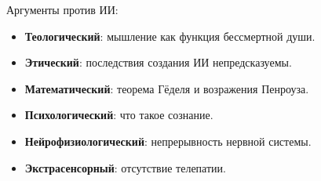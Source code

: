 \documentclass[default]{beamer}
\begin{document}
\begin{frame}
\begin{center}
		\end{center}		
		\footnotesize
		Аргументы против ИИ:
		\begin{itemize}
			\item \textbf{Теологический}: мышление как функция бессмертной души.
			\item \textbf{Этический}: последствия создания ИИ непредсказуемы. 
			\item \textbf{Математический}: теорема Гёделя и возражения Пенроуза.
			\item \textbf{Психологический}: что такое сознание.
			\item \textbf{Нейрофизиологический}: непрерывность нервной системы.
			\item \textbf{Экстрасенсорный}: отсутствие телепатии.
		\end{itemize}
		
		
	\end{frame}
\end{document}
